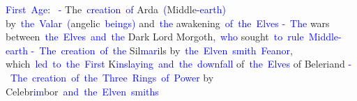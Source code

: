 \documentclass{article}
\begin{document}
\begin{tcolorbox}[colframe=black,colback=white]
\textcolor{blue}{First}\textcolor{blue}{~Age}:\textcolor{blue}{~
}\textcolor{blue}{-} The\textcolor{blue}{~creation}\textcolor{blue}{~of} Arda\textcolor{blue}{~(}Middle\textcolor{blue}{-earth}\textcolor{blue}{)} by\textcolor{blue}{~the}\textcolor{blue}{~Val}\textcolor{blue}{ar}\textcolor{blue}{~(}angelic\textcolor{blue}{~beings}\textcolor{blue}{)} and\textcolor{blue}{~the} awakening\textcolor{blue}{~of}\textcolor{blue}{~the}\textcolor{blue}{~Elves}
\textcolor{blue}{-}\textcolor{blue}{~The} wars between\textcolor{blue}{~the}\textcolor{blue}{~Elves}\textcolor{blue}{~and}\textcolor{blue}{~the} Dark Lord Morgoth\textcolor{blue}{,}\textcolor{blue}{~who} sought\textcolor{blue}{~to}\textcolor{blue}{~rule}\textcolor{blue}{~Middle}\textcolor{blue}{-earth}\textcolor{blue}{
}\textcolor{blue}{-}\textcolor{blue}{~The}\textcolor{blue}{~creation}\textcolor{blue}{~of}\textcolor{blue}{~the} Sil\textcolor{blue}{mar}ils by\textcolor{blue}{~the}\textcolor{blue}{~El}\textcolor{blue}{ven}\textcolor{blue}{~smith}\textcolor{blue}{~Fe}\textcolor{blue}{an}\textcolor{blue}{or}, which\textcolor{blue}{~led}\textcolor{blue}{~to}\textcolor{blue}{~the}\textcolor{blue}{~First} K\textcolor{blue}{ins}\textcolor{blue}{lay}\textcolor{blue}{ing}\textcolor{blue}{~and}\textcolor{blue}{~the}\textcolor{blue}{~downfall} of\textcolor{blue}{~the}\textcolor{blue}{~Elves} of Beleriand\textcolor{blue}{
}\textcolor{blue}{-}\textcolor{blue}{~The}\textcolor{blue}{~creation}\textcolor{blue}{~of}\textcolor{blue}{~the}\textcolor{blue}{~Three}\textcolor{blue}{~Rings}\textcolor{blue}{~of}\textcolor{blue}{~Power} by Celebr\textcolor{blue}{im}bor\textcolor{blue}{~and}\textcolor{blue}{~the}\textcolor{blue}{~El}\textcolor{blue}{ven}\textcolor{blue}{~smith}\textcolor{blue}{s}\textcolor{blue}{

}
\end{tcolorbox}
\end{document}
